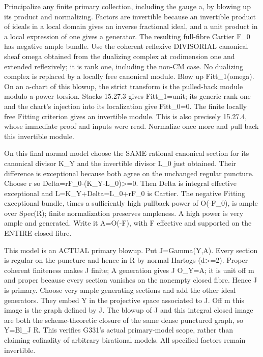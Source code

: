 \documentclass[11pt]{article}
\begin{document}
Principalize any finite primary collection, including the gauge a, by blowing up its product and normalizing. Factors are invertible because an invertible product of ideals in a local domain gives an inverse fractional ideal, and a unit product in a local expression of one gives a generator. The resulting full-fibre Cartier F\_0 has negative ample bundle. Use the coherent reflexive DIVISORIAL canonical sheaf omega obtained from the dualizing complex at codimension one and extended reflexively; it is rank one, including the non-CM case. No dualizing complex is replaced by a locally free canonical module. Blow up Fitt\_1(omega). On an a-chart of this blowup, the strict transform is the pulled-back module modulo a-power torsion. Stacks 15.27.3 gives Fitt\_1=unit; its generic rank one and the chart's injection into its localization give Fitt\_0=0. The finite locally free Fitting criterion gives an invertible module. This is also precisely 15.27.4, whose immediate proof and inputs were read. Normalize once more and pull back this invertible module.

On this final normal model choose the SAME rational canonical section for its canonical divisor K\_Y and the invertible divisor L\_0 just obtained. Their difference is exceptional because both agree on the unchanged regular puncture. Choose r so Delta=rF\_0-(K\_Y-L\_0)>=0. Then Delta is integral effective exceptional and L=K\_Y+Delta=L\_0+rF\_0 is Cartier. The negative Fitting exceptional bundle, times a sufficiently high pullback power of O(-F\_0), is ample over Spec(R); finite normalization preserves ampleness. A high power is very ample and generated. Write it A=O(-F), with F effective and supported on the ENTIRE closed fibre.

This model is an ACTUAL primary blowup. Put J=Gamma(Y,A). Every section is regular on the puncture and hence in R by normal Hartogs (d>=2). Proper coherent finiteness makes J finite; A generation gives J O\_Y=A; it is unit off m and proper because every section vanishes on the nonempty closed fibre. Hence J is primary. Choose very ample generating sections and add the other ideal generators. They embed Y in the projective space associated to J. Off m this image is the graph defined by J. The blowup of J and this integral closed image are both the scheme-theoretic closure of the same dense punctured graph, so Y=Bl\_J R. This verifies G331's actual primary-model scope, rather than claiming cofinality of arbitrary birational models. All specified factors remain invertible.
\end{document}

